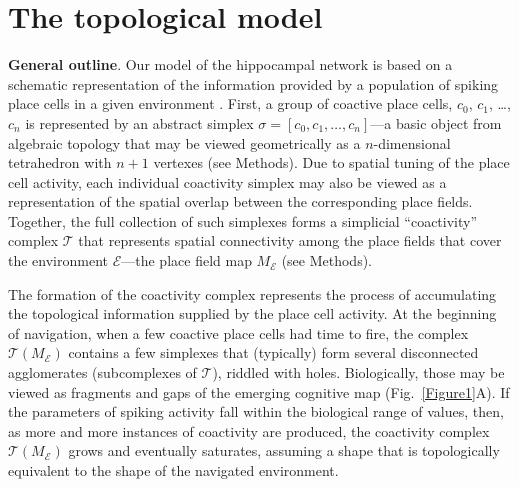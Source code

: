 \documentclass[12pt,tightenlines]{revtex4}
\begin{document}
\section{The topological model}
\label{section:model}

\textbf{General outline}. Our model of the hippocampal network is based on a schematic representation of the 
information provided by a population of spiking place cells in a given environment \cite{Dabaghian,Arai, Basso,Babichev1}. 
First, a group of coactive place cells, $c_0$, $c_1$, \ldots, $c_n$ is represented by an abstract simplex $\sigma = [c_0, c_1, 
\ldots,c_n]$---a basic object from algebraic topology that may be viewed geometrically as a $n$-dimensional tetrahedron 
with $n + 1$ vertexes (see Methods). Due to spatial tuning of the place cell activity, each individual coactivity simplex may 
also be viewed as a representation of the spatial overlap between the corresponding place fields. Together, the full collection 
of such simplexes forms a simplicial ``coactivity'' complex $\mathcal{T}$ that represents spatial connectivity among the 
place fields that cover the environment $\mathcal{E}$---the place field map $M_\mathcal{E}$ (see Methods). 

The formation of the coactivity complex represents the process of accumulating the topological information supplied by the 
place cell activity. At the beginning of navigation, when a few coactive place cells had time to fire, the complex 
$\mathcal{T}(M_\mathcal{E})$ contains a few simplexes that (typically) form several disconnected agglomerates 
(subcomplexes of $\mathcal{T}$), riddled with holes. Biologically, those may be viewed as fragments and gaps of the 
emerging cognitive map (Fig.~\ref{Figure1}A). If the parameters of spiking activity fall within the biological range of values, 
then, as more and more instances of coactivity are produced, the coactivity complex $\mathcal{T}(M_\mathcal{E})$ grows 
and eventually saturates, assuming a shape that is topologically equivalent to the shape of the navigated environment. 
\end{document}
